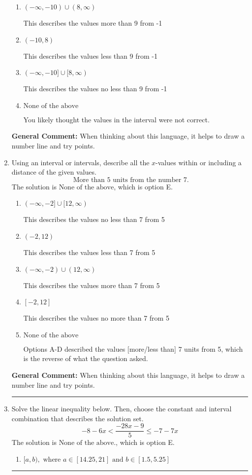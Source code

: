 \documentclass{extbook}[14pt]
\newcommand{\litem}[1]{\item #1

\rule{\textwidth}{0.4pt}}
\begin{document}
\begin{enumerate}
{\begin{enumerate}[label=\Alph*.]
This describes the values no more than 9 from -1
\item \( (-\infty, -10) \cup (8, \infty) \)

This describes the values more than 9 from -1
\item \( (-10, 8) \)

This describes the values less than 9 from -1
\item \( (-\infty, -10] \cup [8, \infty) \)

This describes the values no less than 9 from -1
\item \( \text{None of the above} \)

You likely thought the values in the interval were not correct.
\end{enumerate}

\textbf{General Comment:} When thinking about this language, it helps to draw a number line and try points.
}
\litem{
Using an interval or intervals, describe all the $x$-values within or including a distance of the given values.
\[ \text{ More than } 5 \text{ units from the number } 7. \]The solution is \( \text{None of the above} \), which is option E.\begin{enumerate}[label=\Alph*.]
\item \( (-\infty, -2] \cup [12, \infty) \)

This describes the values no less than 7 from 5
\item \( (-2, 12) \)

This describes the values less than 7 from 5
\item \( (-\infty, -2) \cup (12, \infty) \)

This describes the values more than 7 from 5
\item \( [-2, 12] \)

This describes the values no more than 7 from 5
\item \( \text{None of the above} \)

Options A-D described the values [more/less than] 7 units from 5, which is the reverse of what the question asked.
\end{enumerate}

\textbf{General Comment:} When thinking about this language, it helps to draw a number line and try points.
}
\litem{
Solve the linear inequality below. Then, choose the constant and interval combination that describes the solution set.
\[ -8 - 6 x < \frac{-28 x - 9}{5} \leq -7 - 7 x \]The solution is \( \text{None of the above.} \), which is option E.\begin{enumerate}[label=\Alph*.]
\item \( [a, b), \text{ where } a \in [14.25, 21] \text{ and } b \in [1.5, 5.25] \)


\end{enumerate}}
\end{enumerate}
\end{document}
